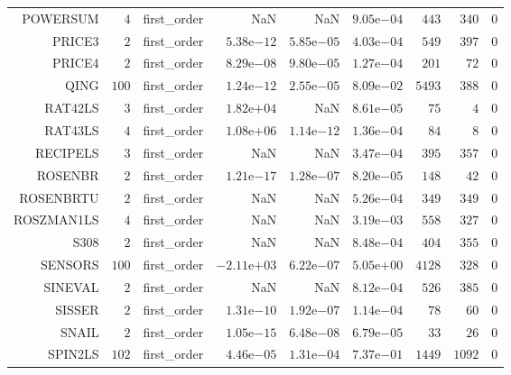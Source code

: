 \begin{longtable}{rrrrrrrrr}
POWERSUM & \(     4\) & first\_order &       NaN &       NaN & \( 9.05\)e\(-04\) & \(   443\) & \(   340\) & \(     0\) \\
PRICE3 & \(     2\) & first\_order & \( 5.38\)e\(-12\) & \( 5.85\)e\(-05\) & \( 4.03\)e\(-04\) & \(   549\) & \(   397\) & \(     0\) \\
PRICE4 & \(     2\) & first\_order & \( 8.29\)e\(-08\) & \( 9.80\)e\(-05\) & \( 1.27\)e\(-04\) & \(   201\) & \(    72\) & \(     0\) \\
QING & \(   100\) & first\_order & \( 1.24\)e\(-12\) & \( 2.55\)e\(-05\) & \( 8.09\)e\(-02\) & \(  5493\) & \(   388\) & \(     0\) \\
RAT42LS & \(     3\) & first\_order & \( 1.82\)e\(+04\) &       NaN & \( 8.61\)e\(-05\) & \(    75\) & \(     4\) & \(     0\) \\
RAT43LS & \(     4\) & first\_order & \( 1.08\)e\(+06\) & \( 1.14\)e\(-12\) & \( 1.36\)e\(-04\) & \(    84\) & \(     8\) & \(     0\) \\
RECIPELS & \(     3\) & first\_order &       NaN &       NaN & \( 3.47\)e\(-04\) & \(   395\) & \(   357\) & \(     0\) \\
ROSENBR & \(     2\) & first\_order & \( 1.21\)e\(-17\) & \( 1.28\)e\(-07\) & \( 8.20\)e\(-05\) & \(   148\) & \(    42\) & \(     0\) \\
ROSENBRTU & \(     2\) & first\_order &       NaN &       NaN & \( 5.26\)e\(-04\) & \(   349\) & \(   349\) & \(     0\) \\
ROSZMAN1LS & \(     4\) & first\_order &       NaN &       NaN & \( 3.19\)e\(-03\) & \(   558\) & \(   327\) & \(     0\) \\
S308 & \(     2\) & first\_order &       NaN &       NaN & \( 8.48\)e\(-04\) & \(   404\) & \(   355\) & \(     0\) \\
SENSORS & \(   100\) & first\_order & \(-2.11\)e\(+03\) & \( 6.22\)e\(-07\) & \( 5.05\)e\(+00\) & \(  4128\) & \(   328\) & \(     0\) \\
SINEVAL & \(     2\) & first\_order &       NaN &       NaN & \( 8.12\)e\(-04\) & \(   526\) & \(   385\) & \(     0\) \\
SISSER & \(     2\) & first\_order & \( 1.31\)e\(-10\) & \( 1.92\)e\(-07\) & \( 1.14\)e\(-04\) & \(    78\) & \(    60\) & \(     0\) \\
SNAIL & \(     2\) & first\_order & \( 1.05\)e\(-15\) & \( 6.48\)e\(-08\) & \( 6.79\)e\(-05\) & \(    33\) & \(    26\) & \(     0\) \\
SPIN2LS & \(   102\) & first\_order & \( 4.46\)e\(-05\) & \( 1.31\)e\(-04\) & \( 7.37\)e\(-01\) & \(  1449\) & \(  1092\) & \(     0\) \\

\end{longtable}
